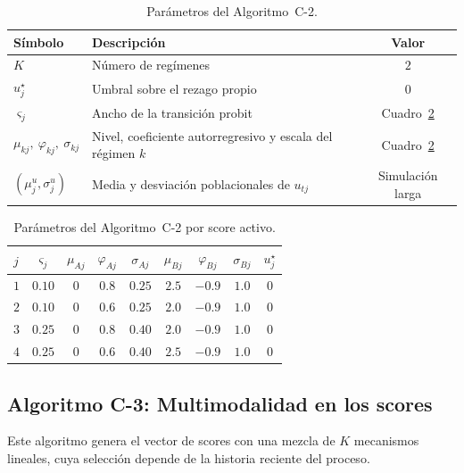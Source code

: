 \begin{table}[H]
\centering
\caption{Parámetros del Algoritmo~C-2.}
\label{tab:ane_algC2}
\begin{tabular}{l p{} c}
\hline
Símbolo & Descripción & Valor \\
\hline
$K$                       & Número de regímenes                                    & $2$ \\
$u_j^{\star}$             & Umbral sobre el rezago propio                          & $0$ \\
$\varsigma_j$                     & Ancho de la transición probit                          & Cuadro~\ref{tab:ane_algC2_scores} \\
$\mu_{kj},\ \varphi_{kj},\ \sigma_{kj}$ & Nivel, coeficiente autorregresivo y escala del régimen $k$ & Cuadro~\ref{tab:ane_algC2_scores} \\
$(\mu_j^{u},\sigma_j^{u})$               & Media y desviación poblacionales de $u_{tj}$           & Simulación larga \\
\hline
\end{tabular}
\end{table}

\begin{table}[H]
\centering
\caption{Parámetros del Algoritmo~C-2 por score activo.}
\label{tab:ane_algC2_scores}
\small\setlength{\tabcolsep}{5pt}
\begin{tabular}{lcccccccc}
\hline
$j$ & $\varsigma_j$ & $\mu_{Aj}$ & $\varphi_{Aj}$ & $\sigma_{Aj}$ & $\mu_{Bj}$ & $\varphi_{Bj}$ & $\sigma_{Bj}$ & $u_j^{\star}$ \\
\hline
$1$ & $0.10$ & $0$ & $0.8$ & $0.25$ & $2.5$ & $-0.9$ & $1.0$ & $0$ \\
$2$ & $0.10$ & $0$ & $0.6$ & $0.25$ & $2.0$ & $-0.9$ & $1.0$ & $0$ \\
$3$ & $0.25$ & $0$ & $0.8$ & $0.40$ & $2.0$ & $-0.9$ & $1.0$ & $0$ \\
$4$ & $0.25$ & $0$ & $0.6$ & $0.40$ & $2.5$ & $-0.9$ & $1.0$ & $0$ \\
\hline
\end{tabular}
\end{table}

\subsection{Algoritmo C-3: Multimodalidad en los scores}
\label{ane_00_02_03_alg_c3}
Este algoritmo genera el vector de scores con una mezcla de $K$ mecanismos lineales, cuya selección depende de la historia reciente del proceso.\\

